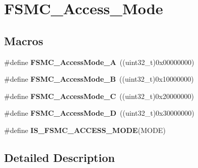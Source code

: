 \hypertarget{group___f_s_m_c___access___mode}{\section{F\-S\-M\-C\-\_\-\-Access\-\_\-\-Mode}
\label{group___f_s_m_c___access___mode}
}
\subsection*{Macros}
\begin{DoxyCompactItemize}
\item 
\hypertarget{group___f_s_m_c___access___mode_gae0f299b51c12257311694c4a8f5c00c3}{\#define {\bfseries F\-S\-M\-C\-\_\-\-Access\-Mode\-\_\-\-A}~((uint32\-\_\-t)0x00000000)}\label{group___f_s_m_c___access___mode_gae0f299b51c12257311694c4a8f5c00c3}

\item 
\hypertarget{group___f_s_m_c___access___mode_ga2d6ce7481eb5e0e86fda727c646e4109}{\#define {\bfseries F\-S\-M\-C\-\_\-\-Access\-Mode\-\_\-\-B}~((uint32\-\_\-t)0x10000000)}\label{group___f_s_m_c___access___mode_ga2d6ce7481eb5e0e86fda727c646e4109}

\item 
\hypertarget{group___f_s_m_c___access___mode_ga83ffa035cf2e95c957b67a2e8b879e86}{\#define {\bfseries F\-S\-M\-C\-\_\-\-Access\-Mode\-\_\-\-C}~((uint32\-\_\-t)0x20000000)}\label{group___f_s_m_c___access___mode_ga83ffa035cf2e95c957b67a2e8b879e86}

\item 
\hypertarget{group___f_s_m_c___access___mode_ga7c632e7ebeb0c0ab4919bb60b8714c7b}{\#define {\bfseries F\-S\-M\-C\-\_\-\-Access\-Mode\-\_\-\-D}~((uint32\-\_\-t)0x30000000)}\label{group___f_s_m_c___access___mode_ga7c632e7ebeb0c0ab4919bb60b8714c7b}

\item 
\#define {\bfseries I\-S\-\_\-\-F\-S\-M\-C\-\_\-\-A\-C\-C\-E\-S\-S\-\_\-\-M\-O\-D\-E}(M\-O\-D\-E)
\end{DoxyCompactItemize}


\subsection{Detailed Description}


